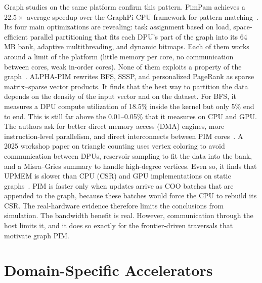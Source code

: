 \documentclass[journal,onecolumn]{IEEEtran}
\begin{document}
Graph studies on the same platform confirm this pattern. PimPam achieves a $22.5\times$ average speedup over the GraphPi CPU framework for pattern matching~\cite{cai2024pimpam}. Its four main optimizations are revealing: task assignment based on load, space-efficient parallel partitioning that fits each DPU's part of the graph into its 64\,MB bank, adaptive multithreading, and dynamic bitmaps. Each of them works around a limit of the platform (little memory per core, no communication between cores, weak in-order cores). None of them exploits a property of the graph~\cite{cai2024pimpam}. ALPHA-PIM rewrites BFS, SSSP, and personalized PageRank as sparse matrix--sparse vector products. It finds that the best way to partition the data depends on the density of the input vector and on the dataset. For BFS, it measures a DPU compute utilization of 18.5\% inside the kernel but only 5\% end to end. This is still far above the 0.01--0.05\% that it measures on CPU and GPU. The authors ask for better direct memory access (DMA) engines, more instruction-level parallelism, and direct interconnects between PIM cores~\cite{barkhordar2025alphapim}. A 2025 workshop paper on triangle counting uses vertex coloring to avoid communication between DPUs, reservoir sampling to fit the data into the bank, and a Misra--Gries summary to handle high-degree vertices. Even so, it finds that UPMEM is slower than CPU (CSR) and GPU implementations on static graphs~\cite{asquini2025tc}. PIM is faster only when updates arrive as COO batches that are appended to the graph, because these batches would force the CPU to rebuild its CSR. The real-hardware evidence therefore limits the conclusions from simulation. The bandwidth benefit is real. However, communication through the host limits it, and it does so exactly for the frontier-driven traversals that motivate graph PIM.

\section{Domain-Specific Accelerators}\label{sec:dsa}
\end{document}

